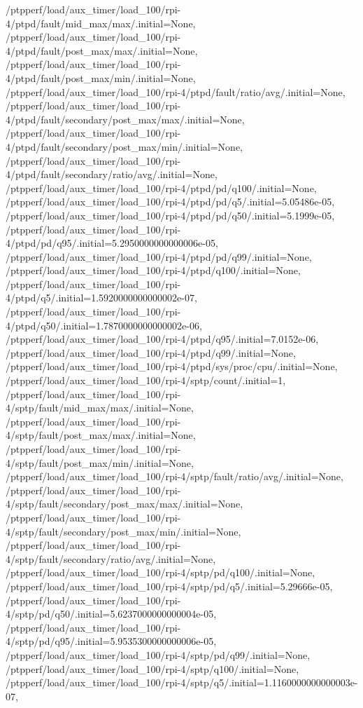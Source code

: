{    /ptpperf/load/aux_timer/load_100/rpi-4/ptpd/fault/mid_max/max/.initial=None,
    /ptpperf/load/aux_timer/load_100/rpi-4/ptpd/fault/post_max/max/.initial=None,
    /ptpperf/load/aux_timer/load_100/rpi-4/ptpd/fault/post_max/min/.initial=None,
    /ptpperf/load/aux_timer/load_100/rpi-4/ptpd/fault/ratio/avg/.initial=None,
    /ptpperf/load/aux_timer/load_100/rpi-4/ptpd/fault/secondary/post_max/max/.initial=None,
    /ptpperf/load/aux_timer/load_100/rpi-4/ptpd/fault/secondary/post_max/min/.initial=None,
    /ptpperf/load/aux_timer/load_100/rpi-4/ptpd/fault/secondary/ratio/avg/.initial=None,
    /ptpperf/load/aux_timer/load_100/rpi-4/ptpd/pd/q100/.initial=None,
    /ptpperf/load/aux_timer/load_100/rpi-4/ptpd/pd/q5/.initial=5.05486e-05,
    /ptpperf/load/aux_timer/load_100/rpi-4/ptpd/pd/q50/.initial=5.1999e-05,
    /ptpperf/load/aux_timer/load_100/rpi-4/ptpd/pd/q95/.initial=5.2950000000000006e-05,
    /ptpperf/load/aux_timer/load_100/rpi-4/ptpd/pd/q99/.initial=None,
    /ptpperf/load/aux_timer/load_100/rpi-4/ptpd/q100/.initial=None,
    /ptpperf/load/aux_timer/load_100/rpi-4/ptpd/q5/.initial=1.5920000000000002e-07,
    /ptpperf/load/aux_timer/load_100/rpi-4/ptpd/q50/.initial=1.7870000000000002e-06,
    /ptpperf/load/aux_timer/load_100/rpi-4/ptpd/q95/.initial=7.0152e-06,
    /ptpperf/load/aux_timer/load_100/rpi-4/ptpd/q99/.initial=None,
    /ptpperf/load/aux_timer/load_100/rpi-4/ptpd/sys/proc/cpu/.initial=None,
    /ptpperf/load/aux_timer/load_100/rpi-4/sptp/count/.initial=1,
    /ptpperf/load/aux_timer/load_100/rpi-4/sptp/fault/mid_max/max/.initial=None,
    /ptpperf/load/aux_timer/load_100/rpi-4/sptp/fault/post_max/max/.initial=None,
    /ptpperf/load/aux_timer/load_100/rpi-4/sptp/fault/post_max/min/.initial=None,
    /ptpperf/load/aux_timer/load_100/rpi-4/sptp/fault/ratio/avg/.initial=None,
    /ptpperf/load/aux_timer/load_100/rpi-4/sptp/fault/secondary/post_max/max/.initial=None,
    /ptpperf/load/aux_timer/load_100/rpi-4/sptp/fault/secondary/post_max/min/.initial=None,
    /ptpperf/load/aux_timer/load_100/rpi-4/sptp/fault/secondary/ratio/avg/.initial=None,
    /ptpperf/load/aux_timer/load_100/rpi-4/sptp/pd/q100/.initial=None,
    /ptpperf/load/aux_timer/load_100/rpi-4/sptp/pd/q5/.initial=5.29666e-05,
    /ptpperf/load/aux_timer/load_100/rpi-4/sptp/pd/q50/.initial=5.6237000000000004e-05,
    /ptpperf/load/aux_timer/load_100/rpi-4/sptp/pd/q95/.initial=5.9535300000000006e-05,
    /ptpperf/load/aux_timer/load_100/rpi-4/sptp/pd/q99/.initial=None,
    /ptpperf/load/aux_timer/load_100/rpi-4/sptp/q100/.initial=None,
    /ptpperf/load/aux_timer/load_100/rpi-4/sptp/q5/.initial=1.1160000000000003e-07,
}
